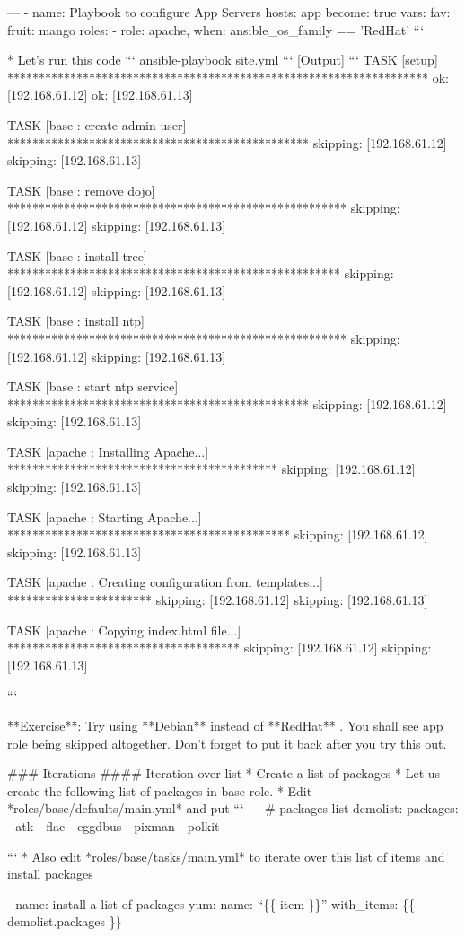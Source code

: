 \begin{code}
  ---
    - name: Playbook to configure App Servers
      hosts: app
      become: true
      vars:
        fav:
          fruit: mango
      roles:
      - { role: apache, when: ansible_os_family == 'RedHat' }
```  

  * Let's run this code  
  ```
  ansible-playbook site.yml
  ```
  [Output]  
  ```
  TASK [setup] *******************************************************************
ok: [192.168.61.12]
ok: [192.168.61.13]

TASK [base : create admin user] ************************************************
skipping: [192.168.61.12]
skipping: [192.168.61.13]

TASK [base : remove dojo] ******************************************************
skipping: [192.168.61.12]
skipping: [192.168.61.13]

TASK [base : install tree] *****************************************************
skipping: [192.168.61.12]
skipping: [192.168.61.13]

TASK [base : install ntp] ******************************************************
skipping: [192.168.61.12]
skipping: [192.168.61.13]

TASK [base : start ntp service] ************************************************
skipping: [192.168.61.12]
skipping: [192.168.61.13]

TASK [apache : Installing Apache...] *******************************************
skipping: [192.168.61.12]
skipping: [192.168.61.13]

TASK [apache : Starting Apache...] *********************************************
skipping: [192.168.61.12]
skipping: [192.168.61.13]

TASK [apache : Creating configuration from templates...] ***********************
skipping: [192.168.61.12]
skipping: [192.168.61.13]

TASK [apache : Copying index.html file...] *************************************
skipping: [192.168.61.12]
skipping: [192.168.61.13]

  ```  

**Exercise**: Try using **Debian** instead of **RedHat** . You shall see app role being skipped altogether. Don't forget to put it back after you try this out.


### Iterations  
#### Iteration over list  
* Create a list of packages  
  * Let us create the following list of packages in base role.  
  * Edit *roles/base/defaults/main.yml* and put  
  ```
---
# packages list
demolist:
  packages:
    - atk
    - flac
    - eggdbus
    - pixman
    - polkit

  ```  
  * Also edit *roles/base/tasks/main.yml* to iterate over this list of items and install packages

\end{code}
  - name: install a list of packages
    yum:
      name: ``\{\{ item \}\}''
    with\_items: \{\{ demolist.packages \}\}

